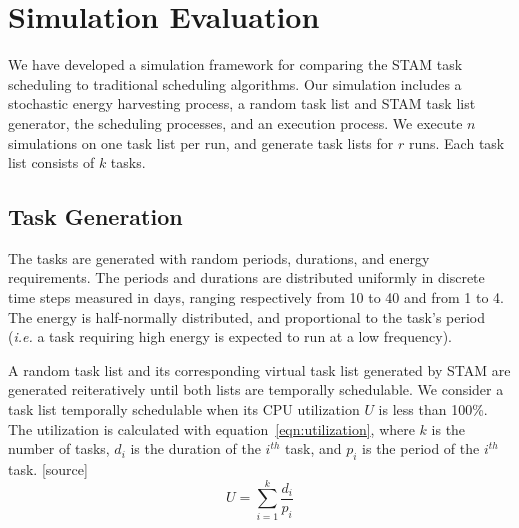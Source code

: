\section{Simulation Evaluation} \label{sec:simulation}

We have developed a simulation framework for comparing the \textsc{STAM} task scheduling to traditional scheduling algorithms.  Our simulation includes a stochastic energy harvesting process, a random task list and \textsc{STAM} task list generator, the scheduling processes, and an execution process.  We execute $n$ simulations on one task list per run, and generate task lists for $r$ runs.  Each task list consists of $k$ tasks.

\subsection{Task Generation}
The tasks are generated with random periods, durations, and energy requirements.  The periods and durations are distributed uniformly in discrete time steps measured in days, ranging respectively from 10 to 40 and from 1 to 4.  The energy is half-normally distributed, and proportional to the task's period (\emph{i.e.} a task requiring high energy is expected to run at a low frequency).

A random task list and its corresponding virtual task list generated by \textsc{STAM} are generated reiteratively until both lists are temporally schedulable.  We consider a task list temporally schedulable when its CPU utilization $U$ is less than 100\%.  The utilization is calculated with equation~\ref{eqn:utilization}, where $k$ is the number of tasks, $d_i$ is the duration of the $i^{th}$ task, and $p_i$ is the period of the $i^{th}$ task. [source]
\begin{equation}
\label{eqn:utilization}
U = \sum_{i=1}^{k} \frac{d_i}{p_i}
\end{equation}
